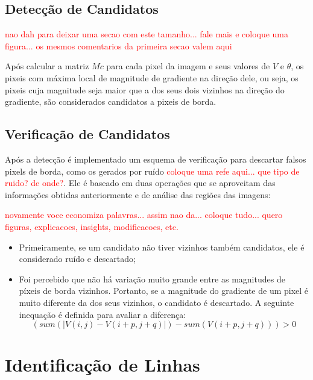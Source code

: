 \subsection{Detecção de Candidatos}

\textcolor{red}{nao dah para deixar uma secao com este tamanho... fale mais e coloque uma figura... os mesmos comentarios da primeira secao valem aqui}

Após calcular a matriz $Mc$ para cada pixel da imagem e seus valores de $V$ e $\theta$, os pixeis com máxima local de magnitude de gradiente na direção dele, ou seja, os pixeis cuja magnitude seja maior que a dos seus dois vizinhos na direção do gradiente, são considerados candidatos a pixeis de borda.

\subsection{Verificação de Candidatos}

Após a detecção é implementado um esquema de verificação para descartar falsos pixels de borda, como os gerados por ruído \textcolor{red}{coloque uma refe aqui... que tipo de ruido? de onde?}. Ele é baseado em duas operações que se aproveitam das informações obtidas anteriormente e de análise das regiões das imagens:

\textcolor{red}{novamente voce economiza palavras... assim nao da... coloque tudo... quero figuras, explicacoes, insights, modificacoes, etc.}

\begin{itemize}
\item Primeiramente, se um candidato não tiver vizinhos também candidatos, ele é considerado ruído e descartado;
\item Foi percebido que não há variação muito grande entre as magnitudes de píxeis de borda vizinhos. Portanto, se a magnitude do gradiente de um pixel é muito diferente da dos seus vizinhos, o candidato é descartado. A seguinte inequação é definida para avaliar a diferença:
$$ (sum(| V(i,j) - V(i+p,j+q) |)- sum(V(i+p,j+q))) >0$$
\end {itemize}

\section{Identificação de Linhas} \label{met:linha}



